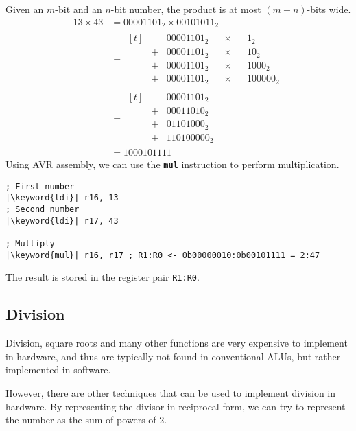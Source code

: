 \documentclass[a4paper]{report}
\newcommand{\keyword}[1]{\textcolor[rgb]{0.00,0.50,0.00}{\textbf{#1}}}
\newcommand{\keywordinline}[1]{\textcolor[rgb]{0.00,0.50,0.00}{\textbf{\texttt{#1}}}}
\begin{document}
Given an \(m\)-bit and an \(n\)-bit number, the product is at most
\((m+n)\)-bits wide.
\begin{align*}
    13 \times 43 & = 00001101_2 \times 00101011_2                    \\
                 & =
                     \begin{aligned}[t]
                          &   & 00001101_2 &  & \times &  & 1_2       \\
                          & + & 00001101_2 &  & \times &  & 10_2      \\
                          & + & 00001101_2 &  & \times &  & 1000_2    \\
                          & + & 00001101_2 &  & \times &  & 100000_2
                     \end{aligned}
    \\
                 & =
                     \begin{aligned}[t]
                          &   & 00001101_2   \\
                          & + & 00011010_2   \\
                          & + & 01101000_2   \\
                          & + & 110100000_2
                     \end{aligned}
    \\
                 & = 1000101111
\end{align*}
Using AVR assembly, we can use the \keywordinline{mul} instruction to perform multiplication.
\begin{verbatim}
; First number
|\keyword{ldi}| r16, 13
; Second number
|\keyword{ldi}| r17, 43

; Multiply
|\keyword{mul}| r16, r17 ; R1:R0 <- 0b00000010:0b00101111 = 2:47
\end{verbatim}
The result is stored in the register pair \texttt{R1:R0}.
\subsection{Division}
Division, square roots and many other functions are very expensive to
implement in hardware, and thus are typically not found in conventional
ALUs, but rather implemented in software.

However, there are other techniques that can be used to implement
division in hardware. By representing the divisor in reciprocal form,
we can try to represent the number as the sum of powers of 2.
\end{document}
